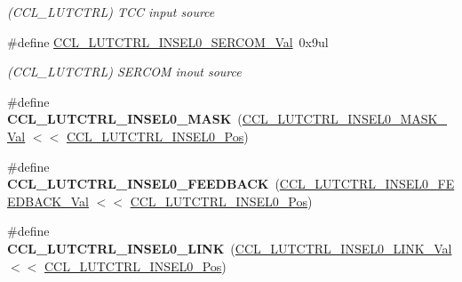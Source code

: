 \begin{DoxyCompactItemize}
\begin{DoxyCompactList}\small\item\em (C\+C\+L\+\_\+\+L\+U\+T\+C\+T\+R\+L) T\+C\+C input source \end{DoxyCompactList}\item 
\hypertarget{group___s_a_m_l21___c_c_l_gad84a8d935132f431e16dbf5b25e6dac9}{}\#define \hyperlink{group___s_a_m_l21___c_c_l_gad84a8d935132f431e16dbf5b25e6dac9}{C\+C\+L\+\_\+\+L\+U\+T\+C\+T\+R\+L\+\_\+\+I\+N\+S\+E\+L0\+\_\+\+S\+E\+R\+C\+O\+M\+\_\+\+Val}~0x9ul\label{group___s_a_m_l21___c_c_l_gad84a8d935132f431e16dbf5b25e6dac9}

\begin{DoxyCompactList}\small\item\em (C\+C\+L\+\_\+\+L\+U\+T\+C\+T\+R\+L) S\+E\+R\+C\+O\+M inout source \end{DoxyCompactList}\item 
\hypertarget{group___s_a_m_l21___c_c_l_ga1d93c0caff240c88ecebb3e41511fd6d}{}\#define {\bfseries C\+C\+L\+\_\+\+L\+U\+T\+C\+T\+R\+L\+\_\+\+I\+N\+S\+E\+L0\+\_\+\+M\+A\+S\+K}~(\hyperlink{group___s_a_m_l21___c_c_l_ga2fc3f172fd108a2ac9808430a8ac1637}{C\+C\+L\+\_\+\+L\+U\+T\+C\+T\+R\+L\+\_\+\+I\+N\+S\+E\+L0\+\_\+\+M\+A\+S\+K\+\_\+\+Val}   $<$$<$ \hyperlink{group___s_a_m_l21___c_c_l_gae20b08aa5e8fcd9eb3a1a118441de53d}{C\+C\+L\+\_\+\+L\+U\+T\+C\+T\+R\+L\+\_\+\+I\+N\+S\+E\+L0\+\_\+\+Pos})\label{group___s_a_m_l21___c_c_l_ga1d93c0caff240c88ecebb3e41511fd6d}

\item 
\hypertarget{group___s_a_m_l21___c_c_l_ga8d906f8cfbee512d83437b2d419ebc2b}{}\#define {\bfseries C\+C\+L\+\_\+\+L\+U\+T\+C\+T\+R\+L\+\_\+\+I\+N\+S\+E\+L0\+\_\+\+F\+E\+E\+D\+B\+A\+C\+K}~(\hyperlink{group___s_a_m_l21___c_c_l_gaedcfd4d1e7166bb561c19c59b9efb08f}{C\+C\+L\+\_\+\+L\+U\+T\+C\+T\+R\+L\+\_\+\+I\+N\+S\+E\+L0\+\_\+\+F\+E\+E\+D\+B\+A\+C\+K\+\_\+\+Val} $<$$<$ \hyperlink{group___s_a_m_l21___c_c_l_gae20b08aa5e8fcd9eb3a1a118441de53d}{C\+C\+L\+\_\+\+L\+U\+T\+C\+T\+R\+L\+\_\+\+I\+N\+S\+E\+L0\+\_\+\+Pos})\label{group___s_a_m_l21___c_c_l_ga8d906f8cfbee512d83437b2d419ebc2b}

\item 
\hypertarget{group___s_a_m_l21___c_c_l_gad2e39540bf89e6f444ca56498558f8eb}{}\#define {\bfseries C\+C\+L\+\_\+\+L\+U\+T\+C\+T\+R\+L\+\_\+\+I\+N\+S\+E\+L0\+\_\+\+L\+I\+N\+K}~(\hyperlink{group___s_a_m_l21___c_c_l_ga96dd3c1ff426f4ef5a004d6259fff801}{C\+C\+L\+\_\+\+L\+U\+T\+C\+T\+R\+L\+\_\+\+I\+N\+S\+E\+L0\+\_\+\+L\+I\+N\+K\+\_\+\+Val}   $<$$<$ \hyperlink{group___s_a_m_l21___c_c_l_gae20b08aa5e8fcd9eb3a1a118441de53d}{C\+C\+L\+\_\+\+L\+U\+T\+C\+T\+R\+L\+\_\+\+I\+N\+S\+E\+L0\+\_\+\+Pos})\label{group___s_a_m_l21___c_c_l_gad2e39540bf89e6f444ca56498558f8eb}


\end{DoxyCompactItemize}
